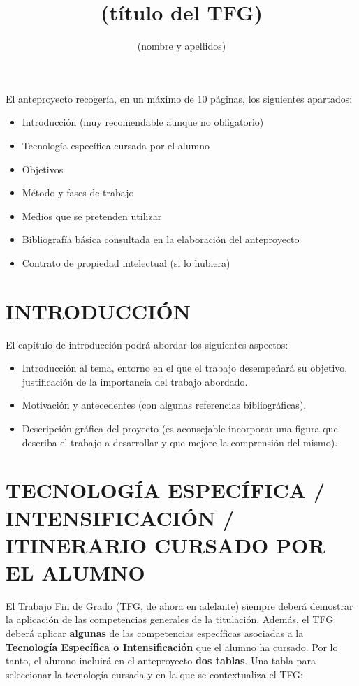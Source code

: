 \documentclass{pre-tfg}
\title{(título del TFG)}
\author{(nombre y apellidos)}
\begin{document}
\maketitle
\tableofcontents

\newpage

El anteproyecto recogería, en un \textcolor[rgb]{0.5,0.0,0.0}{máximo de 10 páginas},
los siguientes apartados:

\begin{itemize}
\item Introducción (muy recomendable aunque no obligatorio)
\item Tecnología específica cursada por el alumno
\item Objetivos
\item Método y fases de trabajo
\item Medios que se pretenden utilizar
\item Bibliografía básica consultada en la elaboración del anteproyecto
\item Contrato de propiedad intelectual (si lo hubiera)
\end{itemize}


\section{INTRODUCCIÓN}

El capítulo de introducción podrá abordar los siguientes aspectos:

\begin{itemize}
\item Introducción al tema, entorno en el que el trabajo desempeñará
  su objetivo, justificación de la importancia del trabajo abordado.
\item Motivación y antecedentes (con algunas referencias bibliográficas).
\item Descripción gráfica del proyecto (es aconsejable incorporar una figura que describa
  el trabajo a desarrollar y que mejore la comprensión del mismo).
\end{itemize}


\section{TECNOLOGÍA ESPECÍFICA / INTENSIFICACIÓN / ITINERARIO CURSADO POR EL ALUMNO}

El Trabajo Fin de Grado (TFG, de ahora en adelante) siempre deberá demostrar la aplicación
de las competencias generales de la titulación. Además, el TFG deberá aplicar
\textbf{algunas} de las competencias específicas asociadas a la \textbf{Tecnología
  Específica o Intensificación} que el alumno ha cursado. Por lo tanto, el alumno incluirá
en el anteproyecto \textbf{dos tablas}. Una tabla para seleccionar la tecnología cursada y
en la que se contextualiza el TFG:
\end{document}
